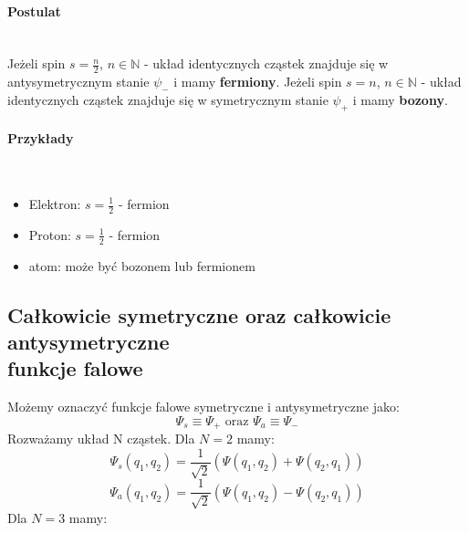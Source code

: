 \paragraph*{Postulat}\mbox{}\\
%
Jeżeli spin $s = \frac{n}{2}$, $n \in \mathbb{N}$ - układ identycznych cząstek znajduje się w antysymetrycznym stanie $\psi_-$ i mamy \textbf{fermiony}.
Jeżeli spin $s = n$, $n \in \mathbb{N}$ - układ identycznych cząstek znajduje się w symetrycznym stanie $\psi_+$ i mamy \textbf{bozony}.
%
\paragraph*{Przykłady}\mbox{}\\
\begin{itemize}
    \item Elektron: $s = \frac{1}{2}$ - fermion
    \item Proton: $s = \frac{1}{2}$ - fermion
    \item atom: może być bozonem lub fermionem
\end{itemize}
%
\subsection{Całkowicie symetryczne oraz całkowicie antysymetryczne \\ funkcje falowe}
%
Możemy oznaczyć funkcje falowe symetryczne i antysymetryczne jako:
%
\begin{equation*}
    \Psi_s \equiv \Psi_+ \text{ oraz } \Psi_a \equiv \Psi_-
\end{equation*}
Rozważamy układ N cząstek.
%
Dla $N = 2$ mamy:
%
\begin{equation*}
    \Psi_s (q_1, q_2) = \frac{1}{\sqrt{2}} \left( \Psi(q_1, q_2) + \Psi(q_2, q_1) \right)
\end{equation*}
%
\begin{equation*}
    \Psi_a (q_1, q_2) = \frac{1}{\sqrt{2}} \left( \Psi(q_1, q_2) - \Psi(q_2, q_1) \right)
\end{equation*}
%
Dla $N = 3$ mamy:
%

